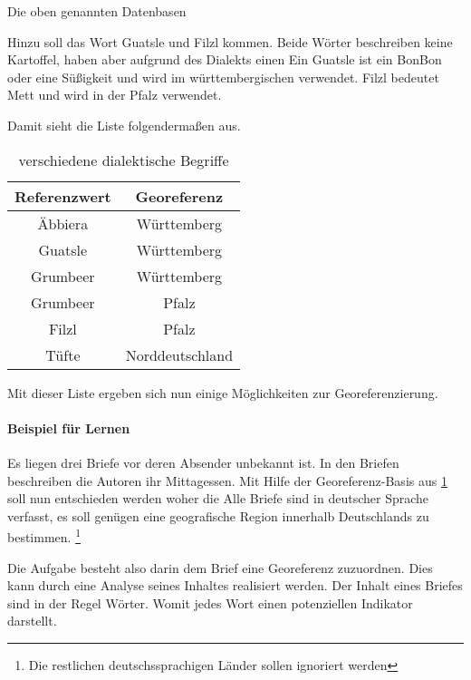 			Die oben genannten Datenbasen  

				Hinzu soll das Wort Guatsle und Filzl kommen.
				Beide Wörter beschreiben keine Kartoffel, haben aber aufgrund des Dialekts einen 
				Ein Guatsle ist ein BonBon oder eine Süßigkeit und wird im württembergischen verwendet.
				Filzl bedeutet Mett und wird in der Pfalz verwendet.

				Damit sieht die Liste folgendermaßen aus.

				\begin{table}[htpb]
					\caption{verschiedene dialektische Begriffe} 
					\centering
					\begin{tabular}{|c|c|}
						\hline
						Referenzwert & Georeferenz \\
						\hline\hline
						Äbbiera & Württemberg \\
						\hline
						Guatsle & Württemberg \\
						\hline
						Grumbeer & Württemberg \\
						\hline
						Grumbeer & Pfalz \\
						\hline
						Filzl & Pfalz \\
						\hline
						Tüfte & Norddeutschland \\
						\hline
					\end{tabular}
					\label{tab:dialektZwei} 
				\end{table} 

				Mit dieser Liste ergeben sich nun einige Möglichkeiten zur Georeferenzierung.

			

			\paragraph{Beispiel für Lernen} 

				Es liegen drei Briefe vor deren Absender unbekannt ist.
				In den Briefen beschreiben die Autoren ihr Mittagessen. 
				Mit Hilfe der Georeferenz-Basis aus \ref{tab:dialektZwei} soll nun entschieden werden woher die 
				Alle Briefe sind in deutscher Sprache verfasst, es soll genügen eine geografische Region innerhalb Deutschlands zu bestimmen. \footnote{Die restlichen deutschssprachigen Länder sollen ignoriert werden}  

				Die Aufgabe besteht also darin dem Brief eine Georeferenz zuzuordnen. 
				Dies kann durch eine Analyse seines Inhaltes realisiert werden. 
				Der Inhalt eines Briefes sind in der Regel Wörter. 
				Womit jedes Wort einen potenziellen Indikator darstellt.


